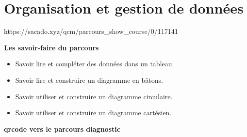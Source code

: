 \chapter{Organisation et gestion de données}
{https://sacado.xyz/qcm/parcours_show_course/0/117141}
{
\begin{CpsCol}
 \textbf{Les savoir-faire du parcours}
 \begin{itemize}
 \item Savoir lire et compléter des données dans un tableau.
 \item Savoir lire et construire un diagramme en bâtons.
 \item Savoir utiliser et construire un diagramme circulaire.
 \item Savoir utiliser et construire un diagramme cartésien.
 \end{itemize}
\end{CpsCol}

\textbf{qrcode vers le parcours diagnostic}

}

